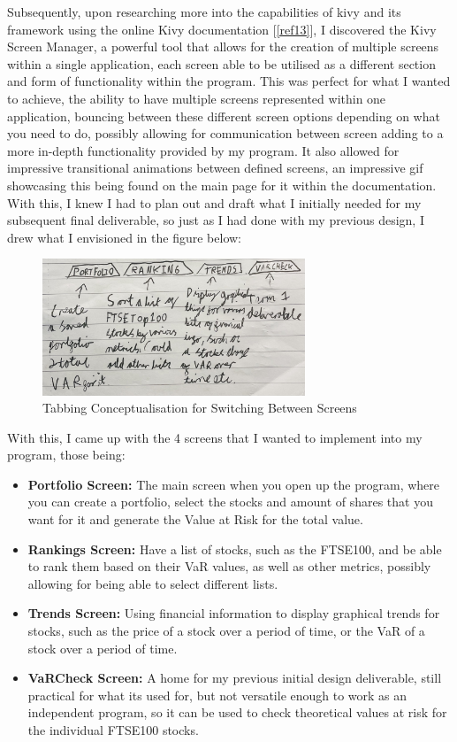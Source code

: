 \documentclass{article}
\begin{document}
Subsequently, upon researching more into the capabilities of kivy and its framework using the online Kivy documentation [\ref{ref13}], I discovered the Kivy Screen Manager, a powerful tool that allows for the creation of multiple screens within a single application, each screen able to be utilised as a different section and form of functionality within the program. This was perfect for what I wanted to achieve, the ability to have multiple screens represented within one application, bouncing between these different screen options depending on what you need to do, possibly allowing for communication between screen adding to a more in-depth functionality provided by my program. It also allowed for impressive transitional animations between defined screens, an impressive gif showcasing this being found on the main page for it within the documentation. With this, I knew I had to plan out and draft what I initially needed for my subsequent final deliverable, so just as I had done with my previous design, I drew what I envisioned in the figure below:\\\vspace{0.3cm}

\begin{figure}[h]
  \centering
  \includegraphics[width=0.7\textwidth]{Images/Term 2 Images/IMG_1346.jpg}
  \caption{Tabbing Conceptualisation for Switching Between Screens}
  \label{fig:Tabbing Concept}
\end{figure}

\newpage
With this, I came up with the 4 screens that I wanted to implement into my program, those being:
\begin{itemize}
  \item \textbf{Portfolio Screen:} The main screen when you open up the program, where you can create a portfolio, select the stocks and amount of shares that you want for it and generate the Value at Risk for the total value.
  \item \textbf{Rankings Screen:} Have a list of stocks, such as the FTSE100, and be able to rank them based on their VaR values, as well as other metrics, possibly allowing for being able to select different lists.
  \item \textbf{Trends Screen:} Using financial information to display graphical trends for stocks, such as the price of a stock over a period of time, or the VaR of a stock over a period of time.
  \item \textbf{VaRCheck Screen:} A home for my previous initial design deliverable, still practical for what its used for, but not versatile enough to work as an independent program, so it can be used to check theoretical values at risk for the individual FTSE100 stocks.
\end{itemize}
\end{document}
